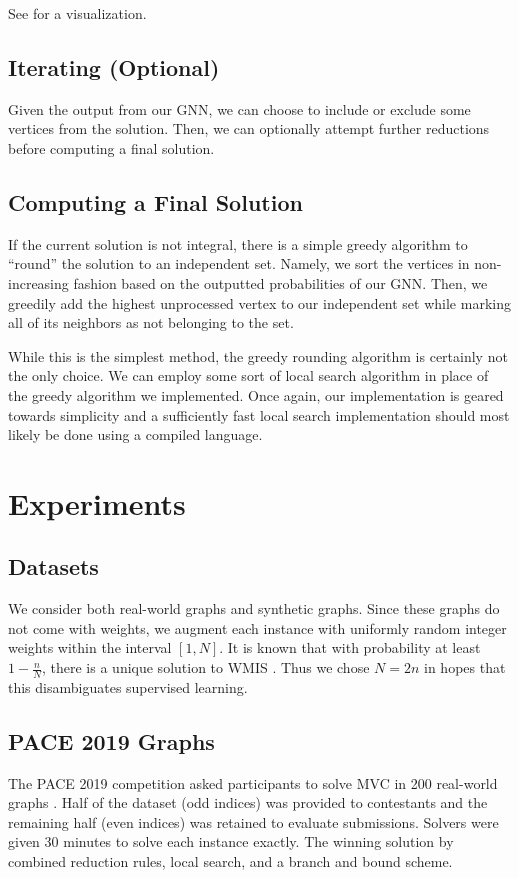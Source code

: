 \documentclass{article}
\begin{document}
See  for a visualization.

\subsection{Iterating (Optional)}
Given the output from our GNN,
we can choose to include or exclude some vertices from the solution.
Then,
we can optionally attempt further reductions before computing a final solution.

\subsection{Computing a Final Solution}
If the current solution is not integral,
there is a simple greedy algorithm to ``round'' the solution to an independent set.
Namely, we sort the vertices in non-increasing fashion based on the outputted probabilities of our GNN.
Then, we greedily add the highest unprocessed vertex to our independent set
while marking all of its neighbors as not belonging to the set.

While this is the simplest method,
the greedy rounding algorithm is certainly not the only choice.
We can employ some sort of local search algorithm \citet{dahlum2016accelerating, chang2017computing} in place of the greedy algorithm we implemented.
Once again,
our implementation is geared towards simplicity
and a sufficiently fast local search implementation
should most likely be done using a compiled language.

\section{Experiments}
\subsection{Datasets}
We consider both real-world graphs and synthetic graphs.
Since these graphs do not come with weights,
we augment each instance with uniformly random integer weights within the interval $[1, N]$.
It is known that with probability at least $1-\frac nN$,
there is a unique solution to WMIS \citet{isolation}.
Thus we chose $N = 2n$ in hopes that this disambiguates supervised learning.

\subsection{PACE 2019 Graphs}
The PACE 2019 competition asked participants to solve MVC in 200 real-world graphs \citet{pace2019}.
Half of the dataset (odd indices) was provided to contestants
and the remaining half (even indices) was retained to evaluate submissions.
Solvers were given 30 minutes to solve each instance exactly.
The winning solution by \citet{wegotyoucovered} combined reduction rules,
local search, and a branch and bound scheme.
\end{document}
